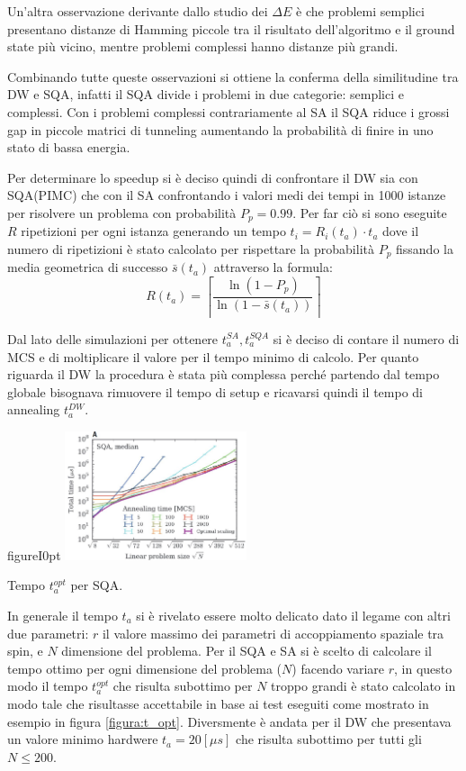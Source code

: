 Un'altra osservazione derivante dallo studio dei $\Delta E$ è che problemi semplici presentano distanze di Hamming piccole tra il risultato dell'algoritmo e il ground state più vicino, mentre problemi complessi hanno distanze più grandi.

Combinando tutte queste osservazioni si ottiene la conferma della similitudine tra DW e SQA, infatti il SQA divide i problemi in due categorie: semplici e complessi. Con i problemi complessi contrariamente al SA il SQA riduce i grossi gap in piccole matrici di tunneling aumentando la probabilità di finire in uno stato di bassa energia.

\cite{DDQS}Per determinare lo speedup si è deciso quindi di confrontare il DW sia con SQA(PIMC) che con il SA confrontando i valori medi dei tempi in 1000 istanze per risolvere un problema con probabilità $P_p=0.99$.
Per far ciò si sono eseguite $R$ ripetizioni per ogni istanza generando un tempo $t_i = R_i(t_a) \cdot t_a$ dove il numero di ripetizioni è stato calcolato per rispettare la probabilità $P_p$ fissando la media geometrica di successo $\bar{s}(t_a)$ attraverso la formula:
$$R(t_a) = \left\lceil\frac{\ln(1 - P_p)}{\ln(1 - \bar{s}(t_a))}\right\rceil$$

Dal lato delle simulazioni per ottenere $t_a^{SA}, t_a^{SQA}$ si è deciso di contare il numero di MCS e di moltiplicare il valore per il tempo minimo di calcolo.
Per quanto riguarda il DW la procedura è stata più complessa perché partendo dal tempo globale bisognava rimuovere il tempo di setup e ricavarsi quindi il tempo di annealing $t_a^{DW}$.

\begin{wrapfloat}{figure}{I}{0pt}
\includegraphics[width=0.4\textwidth]{Immagini/t_opt.jpg}
\caption{Tempo $t_a^{opt}$ per SQA.}
\label{figura:t_opt}
\end{wrapfloat}

In generale il tempo $t_a$ si è rivelato essere molto delicato dato il legame con altri due parametri: $r$ il valore massimo dei parametri di accoppiamento spaziale tra spin, e $N$ dimensione del problema.
Per il SQA e SA si è scelto di calcolare il tempo ottimo per ogni dimensione del problema ($N$) facendo variare $r$, in questo modo il tempo $t_a^{opt}$ che risulta subottimo per $N$ troppo grandi è stato calcolato in modo tale che risultasse accettabile in base ai test eseguiti come mostrato in esempio in figura \ref{figura:t_opt}. Diversmente è andata per il DW che presentava un valore minimo hardwere $t_a = 20 [\mu s]$ che risulta subottimo per tutti gli $N \le 200$.

